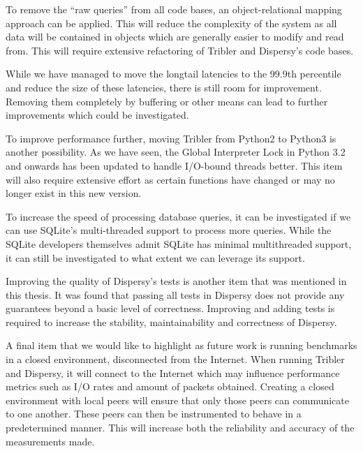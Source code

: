 To remove the \enquote{raw queries} from all code bases, an object-relational mapping approach can be applied.
This will reduce the complexity of the system as all data will be contained in objects which are generally easier to modify and read from.
This will require extensive refactoring of Tribler and Dispersy's code bases.

While we have managed to move the longtail latencies to the 99.9th percentile and reduce the size of these latencies, there is still room for improvement.
Removing them completely by buffering or other means can lead to further improvements which could be investigated.

To improve performance further, moving Tribler from Python2 to Python3 is another possibility.
As we have seen, the Global Interpreter Lock in Python 3.2 and onwards has been updated to handle I/O-bound threads better.
This item will also require extensive effort as certain functions have changed or may no longer exist in this new version.

To increase the speed of processing database queries, it can be investigated if we can use SQLite's multi-threaded support to process more queries.
While the SQLite developers themselves admit SQLite has minimal multithreaded support, it can still be investigated to what extent we can leverage its support.

Improving the quality of Dispersy's tests is another item that was mentioned in this thesis.
It was found that passing all tests in Dispersy does not provide any guarantees beyond a basic level of correctness.
Improving and adding tests is required to increase the stability, maintainability and correctness of Dispersy.

A final item that we would like to highlight as future work is running benchmarks in a closed environment, disconnected from the Internet.
When running Tribler and Dispersy, it will connect to the Internet which may influence performance metrics such as I/O rates and amount of packets obtained.
Creating a closed environment with local peers will ensure that only those peers can communicate to one another.
These peers can then be instrumented to behave in a predetermined manner.
This will increase both the reliability and accuracy of the measurements made.
